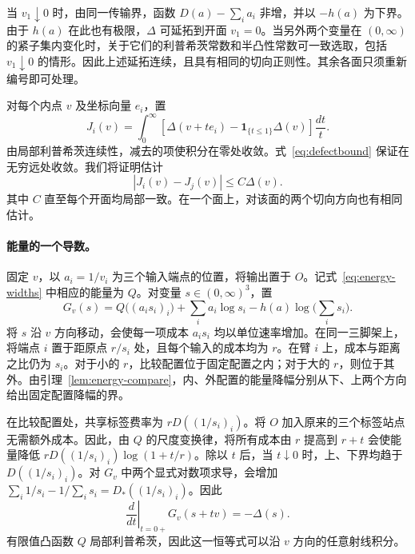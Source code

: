 当 $v_1\downarrow0$ 时，由同一传输界，函数 $D(a)-\sum_i a_i$ 非增，并以 $-h(a)$ 为下界。由于 $h(a)$ 在此也有极限，$\Delta$ 可延拓到开面 $v_1=0$。当另外两个变量在 $(0,\infty)$ 的紧子集内变化时，关于它们的利普希茨常数和半凸性常数可一致选取，包括 $v_1\downarrow0$ 的情形。因此上述延拓连续，且具有相同的切向正则性。其余各面只须重新编号即可处理。

对每个内点 $v$ 及坐标向量 $e_i$，置
\[
 J_i(v)=\int_0^\infty
 \left[\Delta(v+t e_i)-\mathbf 1_{\{t\le1\}}\Delta(v)\right]
       \frac{dt}{t}.
\]
由局部利普希茨连续性，减去的项使积分在零处收敛。式~\eqref{eq:defectbound} 保证在无穷远处收敛。我们将证明估计
\begin{equation}\label{eq:src10}
                   |J_i(v)-J_j(v)|\le C\Delta(v).
\end{equation}
其中 $C$ 直至每个开面均局部一致。在一个面上，对该面的两个切向方向也有相同估计。

\paragraph{能量的一个导数。}
固定 $v$，以 $a_i=1/v_i$ 为三个输入端点的位置，将输出置于 $O$。记式~\eqref{eq:energy-widths} 中相应的能量为 $Q$。对变量 $s\in(0,\infty)^3$，置
\[
 G_v(s)=Q\big((a_i s_i)_i\big)+\sum_i a_i\log s_i
                   -h(a)\log\Big(\sum_i s_i\Big).
\]
将 $s$ 沿 $v$ 方向移动，会使每一项成本 $a_i s_i$ 均以单位速率增加。在同一三脚架上，将端点 $i$ 置于距原点 $r/s_i$ 处，且每个输入的成本均为 $r$。在臂 $i$ 上，成本与距离之比仍为 $s_i$。对于小的 $r$，比较配置位于固定配置之内；对于大的 $r$，则位于其外。由引理~\ref{lem:energy-compare}，内、外配置的能量降幅分别从下、上两个方向给出固定配置降幅的界。

在比较配置处，共享标签费率为 $rD((1/s_i)_i)$。将 $O$ 加入原来的三个标签站点无需额外成本。因此，由 $Q$ 的尺度变换律，将所有成本由 $r$ 提高到 $r+t$ 会使能量降低 $rD((1/s_i)_i)\log(1+t/r)$。除以 $t$ 后，当 $t\downarrow0$ 时，上、下界均趋于 $D((1/s_i)_i)$。对 $G_v$ 中两个显式对数项求导，会增加 $\sum_i1/s_i-1/\sum_i s_i=D_*((1/s_i)_i)$。因此
\begin{equation}\label{eq:src8}
       \left.\frac{d}{dt}\right|_{t=0+}G_v(s+tv)=-\Delta(s).
\end{equation}
有限值凸函数 $Q$ 局部利普希茨，因此这一恒等式可以沿 $v$ 方向的任意射线积分。

